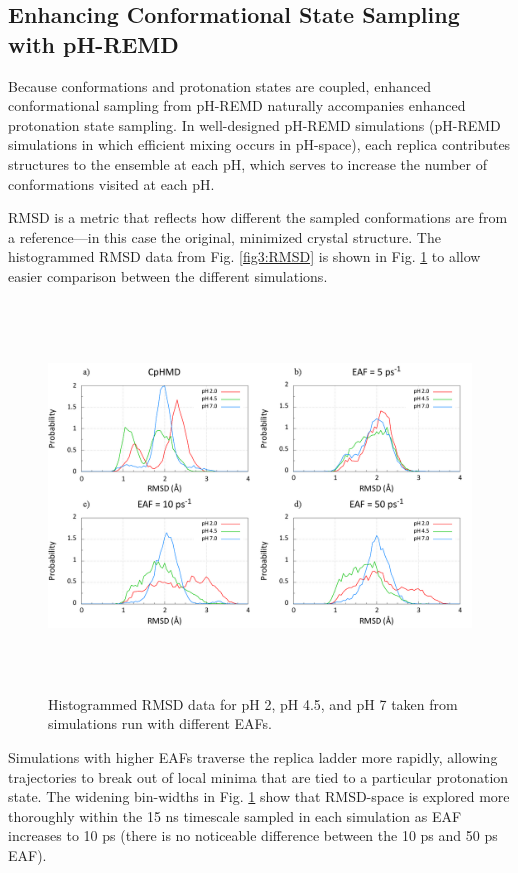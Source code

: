 \subsection{Enhancing Conformational State Sampling with pH-REMD}

Because conformations and protonation states are coupled, enhanced
conformational sampling from pH-REMD naturally accompanies enhanced protonation
state sampling. In well-designed pH-REMD simulations (\ie pH-REMD simulations
in which efficient mixing occurs in pH-space), each replica contributes
structures to the ensemble at each pH, which serves to increase the number of
conformations visited at each pH.

RMSD is a metric that reflects how different the sampled conformations are from
a reference---in this case the original, minimized crystal structure.  The
histogrammed RMSD data from Fig. \ref{fig3:RMSD} is shown in Fig.
\ref{fig3:RMSD_bin} to allow easier comparison between the different
simulations.

\begin{figure}
 \includegraphics[width=6.5in, height=4.06in]{1AKI_RMSD_Comparison_bins.png}
 \caption{Histogrammed RMSD data for pH 2, pH 4.5, and pH 7 taken from
          simulations run with different EAFs.}
 \label{fig3:RMSD_bin}
\end{figure}

Simulations with higher EAFs traverse the replica ladder more rapidly, allowing
trajectories to break out of local minima that are tied to a particular
protonation state.  The widening bin-widths in Fig. \ref{fig3:RMSD_bin} show
that RMSD-space is explored more thoroughly within the 15 ns timescale sampled
in each simulation as EAF increases to 10 ps (there is no noticeable
difference between the 10 ps and 50 ps EAF).

